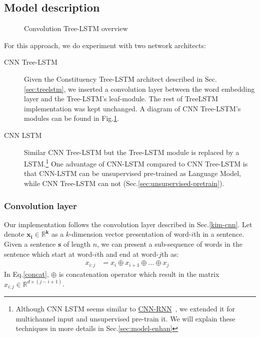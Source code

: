 \subsection{Model description}
\begin{figure}[H]
    \centering
    \caption[Convolution Tree-LSTM overview]{Convolution Tree-LSTM overview}
    \label{fig:convtreelstmsummary}
\end{figure}
For this approach, we do experiment with two network architects:
\begin{description}
\item[CNN Tree-LSTM] Given the Constituency Tree-LSTM architect described in Sec.\ref{sec:treelstm},  we inserted a convolution layer between the word embedding layer and the Tree-LSTM's leaf-module.
The rest of TreeLSTM implementation was kept unchanged.
A diagram of CNN Tree-LSTM's modules can be found in Fig.\ref{fig:convtreelstmsummary}.
\item[CNN LSTM] Similar CNN Tree-LSTM but the Tree-LSTM module is replaced by a LSTM.\footnote{Although CNN LSTM seems similar to \hyperref[cnn-rnn]{CNN-RNN}~\cite{cnn-rnn}, we extended it for multichannel input and unsupervised pre-train it. We will explain these techniques in more details in Sec.\ref{sec:model-enhan}}
One advantage of CNN-LSTM compared to CNN Tree-LSTM is that CNN-LSTM can be unsupervised pre-trained as Language Model, while CNN Tree-LSTM can not (Sec.\ref{sec:unsupervised-pretrain}).
\end{description}


\subsubsection{Convolution layer} \label{sec:conv1c}
Our implementation follows the convolution layer described in Sec.\ref{kim-cnn}.
Let denote \(\bm{x_i \in \mathbb{R}^k}\) as a \(k\)-dimension vector presentation of word-\(i\)th in a sentence.
Given a sentence \(\bm{s}\) of length \(n\), we can present a sub-sequence of words in the sentence which start at word-\(i\)th and end at word-\(j\)th as:
\begin{align}
    x_{i:j} &= x_i \oplus x_{i+1} \oplus ... \oplus x_{j} &\label{concat}
\end{align}
In Eq.\eqref{concat}, \(\bm{\oplus}\) is concatenation operator which result in the matrix \(x_{i:j} \in \mathbb{R}^{d \times (j-i+1)}\).

